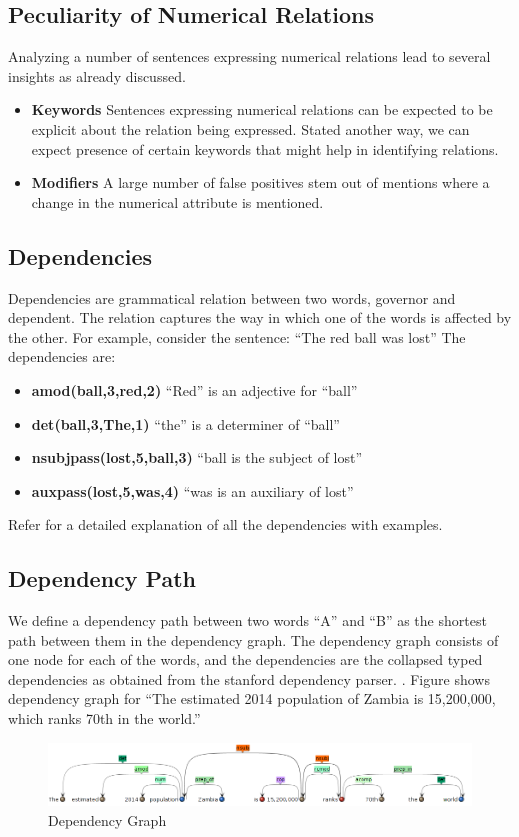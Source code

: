\documentclass[a4paper,10pt]{article}
\begin{document}
\subsection{Peculiarity of Numerical Relations}
Analyzing a number of sentences expressing numerical relations lead to several insights as already discussed.
\begin{itemize}
 \item \textbf{Keywords} Sentences expressing numerical relations can be expected to be explicit about the relation being expressed.
 Stated another way, we can expect presence of certain keywords that might help in identifying relations.
 \item \textbf{Modifiers} A large number of false positives stem out of mentions where a change in the numerical attribute is mentioned.
\end{itemize}

\subsection{Dependencies}
Dependencies are grammatical relation between two words, governor and dependent.
The relation captures the way in which one of the words is affected by the other.
For example, consider the sentence:
``The red ball was lost''
The dependencies are:
\begin{itemize}

\item \textbf{amod(ball,3,red,2)} ``Red'' is an adjective for ``ball''
\item \textbf{det(ball,3,The,1)}  ``the'' is a determiner of ``ball''
\item \textbf{nsubjpass(lost,5,ball,3)}	``ball is the subject of lost''
\item \textbf{auxpass(lost,5,was,4)}	``was is an auxiliary of lost''
\end {itemize}

Refer \cite{de2008stanford} for a detailed explanation of all the dependencies with examples.

\subsection{Dependency Path}
We define a dependency path between two words ``A'' and ``B'' as the shortest path between them in the dependency graph.
The dependency graph consists of one node for each of the words, and the dependencies are the collapsed typed dependencies 
as obtained from the stanford dependency parser. \cite{corenlp}. 
Figure \cite{fig:1} shows dependency graph for ``The estimated 2014 population of Zambia is 15,200,000, which ranks 70th in the world.''
\begin{figure}
 \centering
 \includegraphics[bb=0 0 990 149, scale = 0.4]{./dep.png}
 \caption{Dependency Graph}
 \label{fig:1}
\end{figure}
\end{document}
